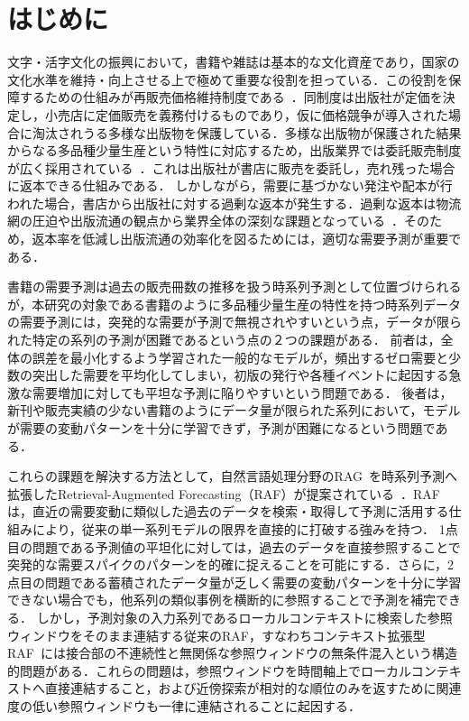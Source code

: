 \documentclass[twocolumn, lastpage]{jarticle}
\begin{document}
\normalsize
\setcounter{page}{1}
\setcounter{secondpage}{1}
\maketitle


\section{はじめに}
文字・活字文化の振興において，書籍や雑誌は基本的な文化資産であり，国家の文化水準を維持・向上させる上で極めて重要な役割を担っている．この役割を保障するための仕組みが再販売価格維持制度である~\cite{JBPA.2001}．同制度は出版社が定価を決定し，小売店に定価販売を義務付けるものであり，仮に価格競争が導入された場合に淘汰されうる多様な出版物を保護している．多様な出版物が保護された結果からなる多品種少量生産という特性に対応するため，出版業界では委託販売制度が広く採用されている~\cite{Shimomura.2005}．これは出版社が書店に販売を委託し，売れ残った場合に返本できる仕組みである．
しかしながら，需要に基づかない発注や配本が行われた場合，書店から出版社に対する過剰な返本が発生する．過剰な返本は物流網の圧迫や出版流通の観点から業界全体の深刻な課題となっている~\cite{Shuppan.2024}．そのため，返本率を低減し出版流通の効率化を図るためには，適切な需要予測が重要である．

書籍の需要予測は過去の販売冊数の推移を扱う時系列予測として位置づけられるが，本研究の対象である書籍のように多品種少量生産の特性を持つ時系列データの需要予測には，突発的な需要が予測で無視されやすいという点，データが限られた特定の系列の予測が困難であるという点の２つの課題がある．
前者は，全体の誤差を最小化するよう学習された一般的なモデルが，頻出するゼロ需要と少数の突出した需要を平均化してしまい，初版の発行や各種イベントに起因する急激な需要増加に対しても平坦な予測に陥りやすいという問題である．
後者は，新刊や販売実績の少ない書籍のようにデータ量が限られた系列において，モデルが需要の変動パターンを十分に学習できず，予測が困難になるという問題である．

これらの課題を解決する方法として，自然言語処理分野のRAG~\cite{Lewis.2020}を時系列予測へ拡張したRetrieval-Augmented Forecasting（RAF）が提案されている~\cite{Tire.2024}．RAFは，直近の需要変動に類似した過去のデータを検索・取得して予測に活用する仕組みにより，従来の単一系列モデルの限界を直接的に打破する強みを持つ．
1点目の問題である予測値の平坦化に対しては，過去のデータを直接参照することで突発的な需要スパイクのパターンを的確に捉えることを可能にする．さらに，2点目の問題である蓄積されたデータ量が乏しく需要の変動パターンを十分に学習できない場合でも，他系列の類似事例を横断的に参照することで予測を補完できる．
しかし，予測対象の入力系列であるローカルコンテキストに検索した参照ウィンドウをそのまま連結する従来のRAF，すなわちコンテキスト拡張型RAF~\cite{Tire.2024}には接合部の不連続性と無関係な参照ウィンドウの無条件混入という構造的問題がある．これらの問題は，参照ウィンドウを時間軸上でローカルコンテキストへ直接連結すること，および近傍探索が相対的な順位のみを返すために関連度の低い参照ウィンドウも一律に連結されることに起因する．
\end{document}
